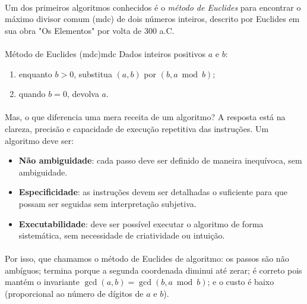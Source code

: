 \documentclass[12pt,a4paper]{article}
\begin{document}
\paragraph{}
Um dos primeiros algoritmos conhecidos é o \emph{método de Euclides} para encontrar o máximo divisor comum (mdc) de dois números inteiros, descrito por Euclides em sua obra "Os Elementos" por volta de 300 a.C. 

\paragraph{}
\begin{algobox}{Método de Euclides (mdc)}{mdc}
Dados inteiros positivos $a$ e $b$:
\begin{enumerate}\setlength{\itemsep}{2pt}
    \item enquanto $b>0$, substitua $(a,b)$ por $(b, a\bmod b)$;
    \item quando $b=0$, devolva $a$.
\end{enumerate}
\end{algobox}

\paragraph{}
Mas, o que diferencia uma mera receita de um algoritmo? A resposta está na clareza, precisão e capacidade de execução repetitiva das instruções. Um algoritmo deve ser:
\begin{itemize}\setlength{\itemsep}{2pt}
    \item \textbf{Não ambiguidade}: cada passo deve ser definido de maneira inequívoca, sem ambiguidade.
    \item \textbf{Especificidade}: as instruções devem ser detalhadas o suficiente para que possam ser seguidas sem interpretação subjetiva.
    \item \textbf{Executabilidade}: deve ser possível executar o algoritmo de forma sistemática, sem necessidade de criatividade ou intuição.
\end{itemize}

\paragraph{}
Por isso, que chamamos o método de Euclides de algoritmo: os passos são não ambíguos; termina porque a segunda coordenada diminui até zerar; é correto pois mantém o invariante $\gcd(a,b)=\gcd(b,a\bmod b)$; e o custo é baixo (proporcional ao número de dígitos de $a$ e $b$).
\end{document}
